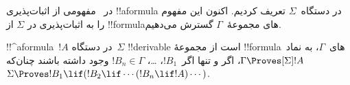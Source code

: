 \documentclass[../../../include/open-logic-section]{subfiles}
\begin{document}


در~ مفهومی از اثبات‌پذیری !!a{formula} در
دستگاه~$\Sigma$ تعریف کردیم. اکنون این مفهوم را به اثبات‌پذیری در
$\Sigma$ از !!{formula}های مجموعهٔ~$\Gamma$ گسترش می‌دهیم.

\begin{defn}
  !!^a{formula}~$!A$ در دستگاه~$\Sigma$ !!{derivable} است از مجموعهٔ
  !!{formula}های~$\Gamma$، به نماد~$\Gamma \Proves[\Sigma] !A$،
  اگر و تنها اگر~$!B_1$، \dots، $!B_n \in \Gamma$ وجود داشته باشند
  چنان‌که
  $\Sigma \Proves !B_1 \lif (!B_2 \lif \cdots (!B_n \lif !A)
  \cdots)$.
\end{defn}
\end{document}
